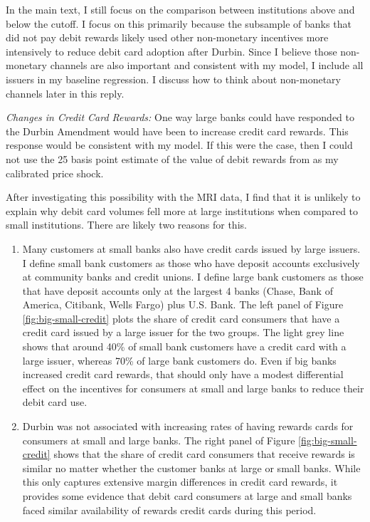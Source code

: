 \documentclass[main.tex]{subfiles}
\begin{document}
\begin{refsection}
In the main text, I still focus on the comparison between institutions above and below the cutoff.
I focus on this primarily because the subsample of banks that did not pay debit rewards likely used other non-monetary incentives more intensively to reduce debit card adoption after Durbin.
Since I believe those non-monetary channels are also important and consistent with my model, I include all issuers in my baseline regression.
I discuss how to think about non-monetary channels later in this reply.

\emph{Changes in Credit Card Rewards: } One way large banks could have responded to the Durbin Amendment would have been to increase credit card rewards.
This response would be consistent with my model.
If this were the case, then I could not use the 25 basis point estimate of the value of debit rewards from \textcite{Hayashi2012} as my calibrated price shock.

After investigating this possibility with the MRI data, I find that it is unlikely to explain why debit card volumes fell more at large institutions when compared to small institutions.
There are likely two reasons for this.
\begin{enumerate}
    \item Many customers at small banks also have credit cards issued by large issuers.
I define small bank customers as those who have deposit accounts exclusively at community banks and credit unions.
I define large bank customers as those that have deposit accounts only at the largest 4 banks (Chase, Bank of America, Citibank, Wells Fargo) plus U.S. Bank.
    The left panel of Figure \ref{fig:big-small-credit} plots the share of credit card consumers that have a credit card issued by a large issuer for the two groups.
The light grey line shows that around 40\% of small bank customers have a credit card with a large issuer, whereas 70\% of large bank customers do.
Even if big banks increased credit card rewards, that should only have a modest differential effect on the incentives for consumers at small and large banks to reduce their debit card use.
    \item Durbin was not associated with increasing rates of having rewards cards for consumers at small and large banks.
The right panel of Figure \ref{fig:big-small-credit} shows that the share of credit card consumers that receive rewards is similar no matter whether the customer banks at large or small banks.
While this only captures extensive margin differences in credit card rewards, it provides some evidence that debit card consumers at large and small banks faced similar availability of rewards credit cards during this period.
\end{enumerate}


\end{refsection}
\end{document}
